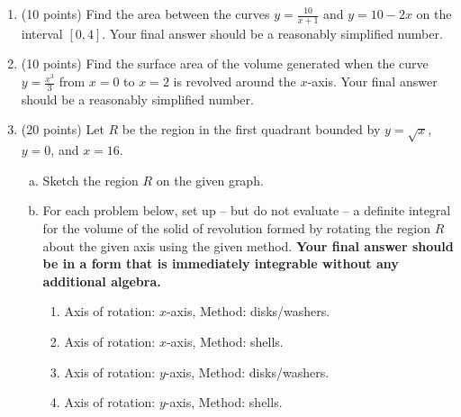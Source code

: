 \documentclass[12pt]{article}
\renewcommand{\emph}[1]{\textsf{\textbf{#1}}}
\begin{document}
\newpage
\begin{enumerate}
\item (10 points) Find the area between the curves {$\displaystyle{y=\frac{10}{x+1}}$} and {$\displaystyle{y=10-2x}$} on the interval $[0,4]$. Your final answer should be a reasonably simplified number. \\

\vfill


\item (10 points) Find the surface area of the volume generated when the curve $y=\frac{x^3}{3}$ from $x=0$ to $x=2$ is revolved around the $x$-axis. Your final answer should be a reasonably simplified number. \\

\vfill

\newpage

\item (20 points) Let $R$ be the region in the first quadrant bounded by $y=\sqrt{x}$, $y=0$, and $x=16$. 
\begin{enumerate}[(a)]
	\item Sketch the region $R$ on the given graph.\\
	\begin{center}
        \end{center}
	
\item For each problem below, set up -- but do not evaluate -- a definite integral for the volume of the solid of revolution formed by rotating the region $R$ about the given axis using the given method. \emph{Your final answer should be in a form that is immediately integrable without any additional algebra.}
\begin{enumerate}
	\item Axis of rotation: $x$-axis, Method: disks/washers.\\
	\vfill
	\item Axis of rotation: $x$-axis, Method: shells.	\\
	\vfill
	\item Axis of rotation: $y$-axis, Method: disks/washers.	\\
	\vfill
	\item Axis of rotation: $y$-axis, Method: shells.	\\
	\vfill
	\end{enumerate}
\end{enumerate}


\end{enumerate}
\end{document}
